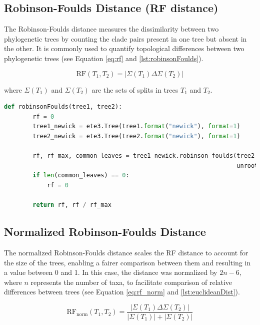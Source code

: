 \subsection{Robinson-Foulds Distance (RF distance)}\label{RF}
The Robinson-Foulds distance measures the dissimilarity between two phylogenetic trees by counting the clade pairs present in one tree but absent in the other. It is commonly used to quantify topological differences between two phylogenetic trees (see Equation \eqref{eq:rf} and \autoref{lst:robinsonFoulds}).

\begin{equation}\label{eq:rf}
    \text{RF}(T_1, T_2) = | \Sigma(T_1) \Delta \Sigma(T_2) |
\end{equation}

where $\Sigma(T_1)$ and $\Sigma(T_2)$ are the sets of splits in trees $T_1$ and $T_2$.

\begin{lstlisting}[label=lst:robinsonFoulds,language=Python,caption=Python script for calculating the Robinson-Foulds distance using the ete3 package in the aPhyloGeo package.]
    def robinsonFoulds(tree1, tree2):
        rf = 0
        tree1_newick = ete3.Tree(tree1.format("newick"), format=1)
        tree2_newick = ete3.Tree(tree2.format("newick"), format=1)

        rf, rf_max, common_leaves = tree1_newick.robinson_foulds(tree2_newick, 
                                                                 unrooted_trees=True)
        if len(common_leaves) == 0:
            rf = 0

        return rf, rf / rf_max
\end{lstlisting}


\subsection{Normalized Robinson-Foulds Distance}\label{RFnorm}
The normalized Robinson-Foulds distance scales the RF distance to account for the size of the trees, enabling a fairer comparison between them and resulting in a value between 0 and 1. In this case, the distance was normalized by $2n-6$, where $n$ represents the number of taxa, to facilitate comparison of relative differences between trees (see Equation \eqref{eq:rf_norm} and \autoref{lst:euclideanDist}).

\begin{equation}\label{eq:rf_norm}
    \text{RF}_{\text{norm}}(T_1, T_2) = \frac{| \Sigma(T_1) \Delta \Sigma(T_2) |}{| \Sigma(T_1) | + | \Sigma(T_2) |}
\end{equation}

